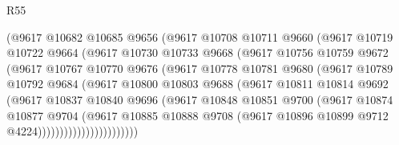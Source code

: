 \begin{lexlean}{R55}
\begin{coremodule}
                    (@9617
                      @10682
                      @10685
                      @9656
                      (@9617
                        @10708
                        @10711
                        @9660
                        (@9617
                          @10719
                          @10722
                          @9664
                          (@9617
                            @10730
                            @10733
                            @9668
                            (@9617
                              @10756
                              @10759
                              @9672
                              (@9617
                                @10767
                                @10770
                                @9676
                                (@9617
                                  @10778
                                  @10781
                                  @9680
                                  (@9617
                                    @10789
                                    @10792
                                    @9684
                                    (@9617
                                      @10800
                                      @10803
                                      @9688
                                      (@9617
                                        @10811
                                        @10814
                                        @9692
                                        (@9617
                                          @10837
                                          @10840
                                          @9696
                                          (@9617
                                            @10848
                                            @10851
                                            @9700
                                            (@9617
                                              @10874
                                              @10877
                                              @9704
                                              (@9617
                                                @10885
                                                @10888
                                                @9708
                                                (@9617
                                                  @10896
                                                  @10899
                                                  @9712
                                                  @4224)))))))))))))))))))))))

\end{coremodule}
\end{lexlean}
